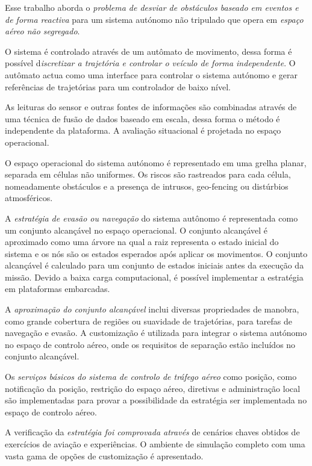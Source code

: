 \noindent Esse trabalho aborda o \textit{problema de desviar de obstáculos baseado em eventos e de forma reactiva} para um sistema autónomo não tripulado que opera em \textit{espaço aéreo não segregado}.

O sistema é controlado através de um autômato de movimento, dessa forma é possível d\textit{iscretizar a trajetória e controlar o veículo de forma independente}. O autômato actua como uma interface  para controlar o sistema autónomo e gerar referências de trajetórias para um controlador de baixo nível.

As leituras do sensor e outras fontes de informações são combinadas através de uma técnica de fusão de dados baseado em escala, dessa forma o método é independente da plataforma. A avaliação situacional é projetada no espaço operacional.


O espaço operacional do sistema autónomo é representado em uma grelha planar, separada em células não uniformes. Os riscos são rastreados para cada célula, nomeadamente obstáculos e a presença de intrusos, geo-fencing ou distúrbios atmosféricos.


A\textit{ estratégia de evasão ou navegação} do sistema autônomo é representada como um conjunto alcançável no espaço operacional. O conjunto alcançável é aproximado como uma árvore na qual a raiz representa o estado inicial do sistema e os nós são os estados esperados após aplicar os movimentos. O conjunto alcançável é calculado para um conjunto de estados iniciais antes da execução da missão. Devido a baixa carga computacional, é possível implementar a estratégia em plataformas embarcadas.

A \textit{aproximação do conjunto alcançável} inclui diversas propriedades de manobra, como grande cobertura de regiões ou suavidade de trajetórias, para tarefas de navegação e evasão. A customização é utilizada para integrar o sistema autónomo no espaço de controlo aéreo, onde os requisitos de separação estão incluídos no conjunto alcançável.

Os \textit{serviços básicos do sistema de controlo de tráfego aéreo} como posição, como notificação da posição, restrição do espaço aéreo, diretivas e administração local são implementadas para provar a possibilidade da estratégia ser implementada no espaço de controlo aéreo.


A verificação da \textit{estratégia foi comprovada através} de cenários chaves obtidos de exercícios de  aviação e experiências. O ambiente de simulação completo com uma vasta gama de opções de customização é apresentado.
